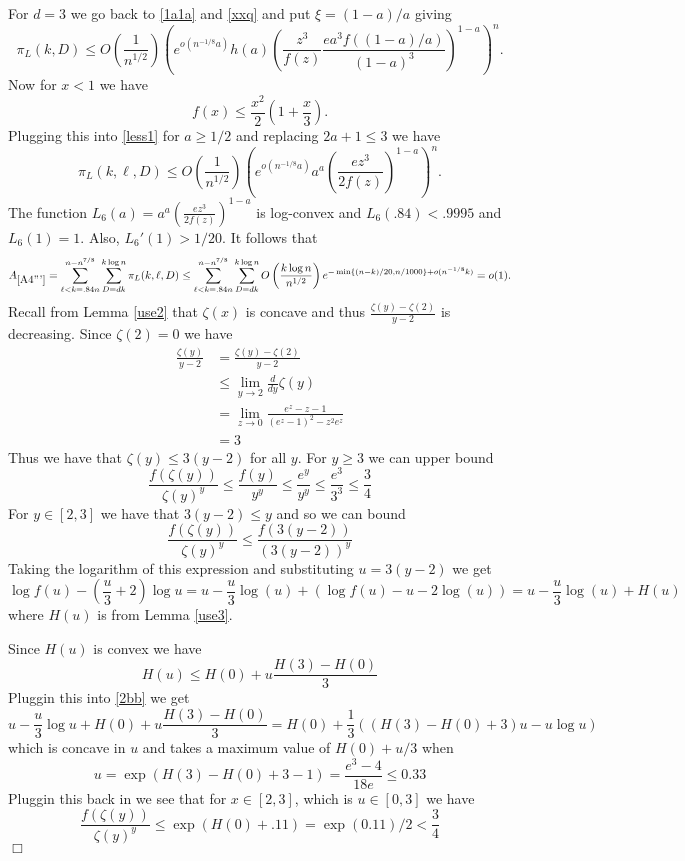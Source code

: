 \documentclass[11pt]{article}
\newenvironment{proofof}[1]{{\bf Proof of #1:  }}{\hfill\mbox{$\Box$}}
\def\z{\zeta}
\def\p{\pi}
\newcommand{\set}[1]{\left\{#1\right\}}
\newcommand{\brac}[1]{\left(#1\right)}
\newcommand{\bfrac}[2]{\brac{\frac{#1}{#2}}}
\newcommand{\beq}[1]{\begin{equation}\label{#1}}
\newcommand{\eeq}{\end{equation}}
\begin{document}
For $d=3$ we go back to \eqref{1a1a} and \eqref{xxq} and put $\xi=(1-a)/a$ giving
\beq{less1}
\p_L(k,D)\leq O\bfrac{1}{n^{1/2}}\brac{e^{o(n^{-1/8}a)}h(a)\brac{\frac{z^3 }{f(z)}\frac{ea^3f((1-a)/a)}{(1-a)^3}}^{1-a}}^n.
\eeq
Now for $x<1$ we have
$$f(x)\leq \frac{x^2}{2}\brac{1+\frac{x}{3}}.$$
Plugging this into \eqref{less1} for $a\geq 1/2$ and replacing $2a+1\leq3$ we have
\beq{less2}
\p_L(k,\ell,D)\leq O\bfrac{1}{n^{1/2}}\brac{e^{o(n^{-1/8}a)}a^a\brac{\frac{ez^3}{2f(z)}}^{1-a}}^n.
\eeq
The function $L_6(a)=a^a\brac{\frac{ez^3}{2f(z)}}^{1-a}$ is log-convex and $L_6(.84)<.9995$ and $L_6(1)=1$. 
Also, $L_6'(1)>1/20$. It follows that
\beq{A4'''}
A_{\ref{A4'''}}=\sum_{\ell<k=.84n}^{n-n^{7/8}}\sum_{D=dk}^{k\log n}\p_L(k,\ell,D)\leq \sum_{\ell<k=.84n}^{n-n^{7/8}}\sum_{D=dk}^{k\log n}
O\bfrac{k\log n}{n^{1/2}}e^{-\min\set{(n-k)/20,n/1000}+o(n^{-1/8}k)}=o(1).
\eeq
\begin{proofof}{Claim \ref{claim:fz}}
Recall from Lemma \ref{use2} that $\z(x)$ is concave and thus $\frac{\z(y)-\z(2)}{y-2}$
is decreasing. Since $\z(2) = 0$ we have
\begin{align*}
\frac{\z(y)}{y-2} &= \frac{\z(y)-\z(2)}{y-2} \\
&\le \lim_{y\to 2}\frac{d}{dy}\z(y)\\
&= \lim_{z\to 0}\frac{e^z-z-1}{(e^z-1)^2-z^2e^z}\\
&= 3
\end{align*}
Thus we have that $\z(y)\le 3(y-2)$ for all $y$. For $y\ge 3$ we can upper bound
$$
\frac{f(\z(y))}{\z(y)^y} \le \frac{f(y)}{y^y} \le \frac{e^y}{y^y} \le \frac{e^3}{3^3} \le \frac{3}{4}
$$
For $y\in[2,3]$ we have that $3(y-2)\le y$ and so we can bound
$$
\frac{f(\z(y))}{\z(y)^y} \le \frac{f(3(y-2))}{(3(y-2))^y}
$$
Taking the logarithm of this expression and substituting $u = 3(y-2)$ we get
\beq{2bb}
\log f(u)-\brac{\frac{u}{3}+2}\log u = u - \frac{u}{3}\log(u) + \brac{\log f(u)-u-2\log(u)}=u - \frac{u}{3}\log(u) + H(u)
\eeq
where $H(u)$ is from Lemma \ref{use3}.

Since $H(u)$ is convex we have
$$
H(u) \le H(0)+u\frac{H(3)-H(0)}{3}
$$
Pluggin this into \eqref{2bb} we get
$$
u-\frac{u}{3}\log{u}+H(0)+u\frac{H(3)-H(0)}{3} = H(0)+\frac{1}{3}\brac{(H(3)-H(0)+3)u-u\log u}
$$
which is concave in $u$ and takes a maximum value of $H(0)+u/3$ when
$$
u=\exp(H(3)-H(0)+3-1) = \frac{e^3-4}{18e} \le 0.33
$$
Pluggin this back in we see that for $x\in [2,3]$, which is $u\in [0,3]$ we have
$$
\frac{f(\z(y))}{\z(y)^y} \le \exp(H(0)+.11) = \exp(0.11)/2 < \frac{3}{4} 
$$
\end{proofof}
\end{document}
